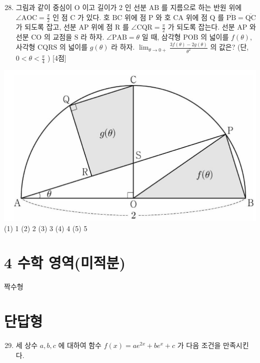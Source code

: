 \documentclass[10pt]{article}
\begin{document}
\begin{enumerate}
  \setcounter{enumi}{27}
  \item 그림과 같이 중심이 $\mathrm{O}$ 이고 길이가 2 인 선분 $\mathrm{AB}$ 를 지름으로 하는 반원 위에 $\angle \mathrm{AOC}=\frac{\pi}{2}$ 인 점 $\mathrm{C}$ 가 있다. 호 $\mathrm{BC}$ 위에 점 $\mathrm{P}$ 와 호 $\mathrm{CA}$ 위에 점 $\mathrm{Q}$ 를 $\overline{\mathrm{PB}}=\overline{\mathrm{QC}}$ 가 되도록 잡고, 선분 $\mathrm{AP}$ 위에 점 $\mathrm{R}$ 를 $\angle \mathrm{CQR}=\frac{\pi}{2}$ 가 되도록 잡는다. 선분 $\mathrm{AP}$ 와 선분 $\mathrm{CO}$ 의 교점을 $\mathrm{S}$ 라 하자. $\angle \mathrm{PAB}=\theta$ 일 때, 삼각형 $\mathrm{POB}$ 의 넓이를 $f(\theta)$, 사각형 $\mathrm{CQRS}$ 의 넓이를 $g(\theta)$ 라 하자. $\lim _{\theta \rightarrow 0+} \frac{3 f(\theta)-2 g(\theta)}{\theta^{2}}$ 의 값은? (단, $0<\theta<\frac{\pi}{4}$ ) [4점]
\end{enumerate}

\includegraphics[max width=\textwidth, center]{2023_05_19_a9cef858603f6abf5411g-35}
(1) 1
(2) 2
(3) 3
(4) 4
(5) 5

\section{4 수학 영역(미적분)}
짝수형

\section{단답형}
\begin{enumerate}
  \setcounter{enumi}{28}
  \item 세 상수 $a, b, c$ 에 대하여 함수 $f(x)=a e^{2 x}+b e^{x}+c$ 가 다음 조건을 만족시킨다.
\end{enumerate}
\end{document}
